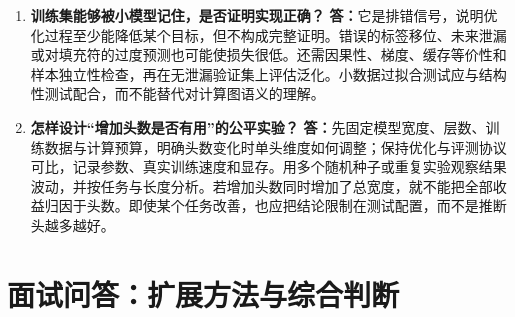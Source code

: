 \documentclass[UTF8,12pt,a4paper,fontset=fandol]{ctexart}
\begin{document}
\begin{enumerate}[resume*=trquestions]
\item \textbf{训练集能够被小模型记住，是否证明实现正确？}
\textbf{答：}它是排错信号，说明优化过程至少能降低某个目标，但不构成完整证明。错误的标签移位、未来泄漏或对填充符的过度预测也可能使损失很低。还需因果性、梯度、缓存等价性和样本独立性检查，再在无泄漏验证集上评估泛化。小数据过拟合测试应与结构性测试配合，而不能替代对计算图语义的理解。

\item \textbf{怎样设计“增加头数是否有用”的公平实验？}
\textbf{答：}先固定模型宽度、层数、训练数据与计算预算，明确头数变化时单头维度如何调整；保持优化与评测协议可比，记录参数、真实训练速度和显存。用多个随机种子或重复实验观察结果波动，并按任务与长度分析。若增加头数同时增加了总宽度，就不能把全部收益归因于头数。即使某个任务改善，也应把结论限制在测试配置，而不是推断头越多越好。
\end{enumerate}

\section{面试问答：扩展方法与综合判断}
\label{sec:tr-qa-advanced}
\end{document}
